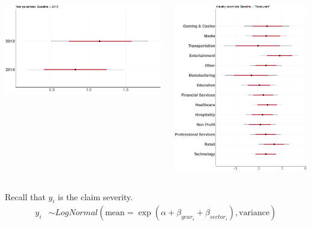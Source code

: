 \documentclass[usenames,dvipsnames]{beamer}
\begin{document}
\begin{frame}
\begin{columns}
\begin{column}[c]{0.49\textwidth}
   \includegraphics[width=0.60\textheight]{./plots/year_comparison}
\end{column}
\begin{column}[c]{0.49\textwidth}
   \includegraphics[width=0.60\textheight]{./plots/sector_comparison}
\end{column}
\end{columns}
\vfill
Recall that $y_i$ is the claim severity.
\begin{align*}
  y_i &\sim LogNormal( \text{mean} = \exp{( \alpha + \beta_{year_i} +  \beta_{sector_i})} , \text{variance} )
\end{align*}
\end{frame}
\end{document}
